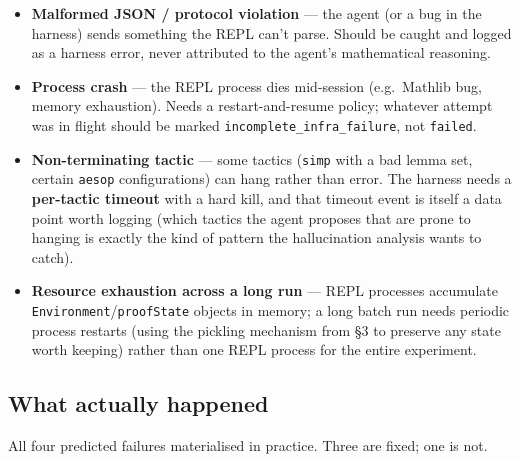 \begin{itemize}
  \item \textbf{Malformed JSON / protocol violation} --- the agent (or a bug in the harness) sends something the REPL can't parse. Should be caught and logged as a harness error, never attributed to the agent's mathematical reasoning.
  \item \textbf{Process crash} --- the REPL process dies mid-session (e.g.\ Mathlib bug, memory exhaustion). Needs a restart-and-resume policy; whatever attempt was in flight should be marked \texttt{incomplete\_infra\_failure}, not \texttt{failed}.
  \item \textbf{Non-terminating tactic} --- some tactics (\texttt{simp} with a bad lemma set, certain \texttt{aesop} configurations) can hang rather than error. The harness needs a \textbf{per-tactic timeout} with a hard kill, and that timeout event is itself a data point worth logging (which tactics the agent proposes that are prone to hanging is exactly the kind of pattern the hallucination analysis wants to catch).
  \item \textbf{Resource exhaustion across a long run} --- REPL processes accumulate \texttt{Environment}/\texttt{proofState} objects in memory; a long batch run needs periodic process restarts (using the pickling mechanism from \S3 to preserve any state worth keeping) rather than one REPL process for the entire experiment.
\end{itemize}

\subsection{What actually happened}

All four predicted failures materialised in practice. Three are fixed; one is not.

